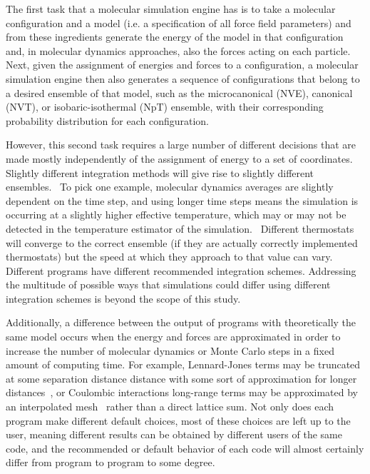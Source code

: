 The first task that a molecular simulation engine has is to take a
molecular configuration and a model (i.e. a specification of all
force field parameters) and from these ingredients generate the energy
of the model in that configuration and, in molecular dynamics
approaches, also the forces acting on each particle.  Next, given the
assignment of energies and forces to a configuration, a molecular
simulation engine then also generates a sequence of configurations
that belong to a desired ensemble of that model, such as the
microcanonical (NVE), canonical (NVT), or isobaric-isothermal (NpT)
ensemble, with their corresponding probability distribution for each
configuration.

However, this second task requires a large number of different
decisions that are made mostly independently of the assignment of
energy to a set of coordinates.  Slightly different integration
methods will give rise to slightly different
ensembles.~\citep{???} To pick one example, molecular dynamics
averages are slightly dependent on the time step, and using longer
time steps means the simulation is occurring at a slightly higher
effective temperature, which may or may not be detected in the
temperature estimator of the simulation.~\citep{???} Different
thermostats will converge to the correct ensemble (if they are
actually correctly implemented thermostats) but the speed at which
they approach to that value can vary. Different programs have
different recommended integration schemes. Addressing the multitude of
possible ways that simulations could differ using different
integration schemes is beyond the scope of this study.

Additionally, a difference between the output of programs with
theoretically the same model occurs when the energy and forces are
approximated in order to increase the number of molecular dynamics or
Monte Carlo steps in a fixed amount of computing time. For example,
Lennard-Jones terms may be truncated at some separation distance
distance with some sort of approximation for longer
distances~\citep{AllenAndTildesley,shirts_accurate_2007,wu_isotropic_2005},
or Coulombic interactions long-range terms may be approximated by an
interpolated mesh~\citep{essmann_smooth_1995} rather than a direct
lattice sum.  Not only does each program make different default
choices, most of these choices are left up to the user, meaning
different results can be obtained by different users of the same code,
and the recommended or default behavior of each code will almost
certainly differ from program to program to some degree.

